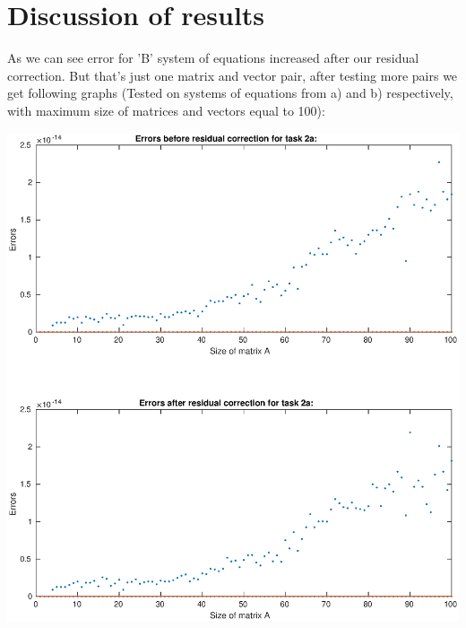 \documentclass[12pt]{report}
\begin{document}
\section{Discussion of results}
As we can see error for 'B' system of equations increased after our residual correction. But that's just one matrix and vector pair, after testing more pairs we get following graphs (Tested on systems of equations from a) and b) respectively, with maximum size of matrices and vectors equal to 100):
\begin{center}
   \includegraphics[scale=0.75]{errorsA.eps}
\end{center}
\end{document}
